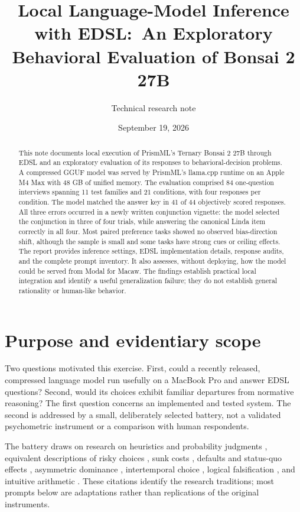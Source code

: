 \documentclass[11pt,letterpaper]{article}
\title{Local Language-Model Inference with EDSL:\
An Exploratory Behavioral Evaluation of Bonsai 2 27B}
\author{Technical research note}
\date{September 19, 2026}
\begin{document}
\maketitle
\begin{abstract}
This note documents local execution of PrismML's Ternary Bonsai 2 27B through
EDSL and an exploratory evaluation of its responses to behavioral-decision
problems. A compressed GGUF model was served by PrismML's llama.cpp runtime on
an Apple M4 Max with 48 GB of unified memory. The evaluation comprised 84
one-question interviews spanning 11 test families and 21 conditions, with four
responses per condition. The model matched the answer key in 41 of 44
objectively scored responses. All three errors occurred in a newly written
conjunction vignette: the model selected the conjunction in three of four
trials, while answering the canonical Linda item correctly in all four.
Most paired preference tasks showed no observed bias-direction shift, although
the sample is small and some tasks have strong cues or ceiling effects.
The report provides inference settings, EDSL implementation details, response
audits, and the complete prompt inventory. It also assesses, without deploying,
how the model could be served from Modal for Macaw. The findings establish
practical local integration and identify a useful generalization failure;
they do not establish general rationality or human-like behavior.
\end{abstract}

\section{Purpose and evidentiary scope}
Two questions motivated this exercise. First, could a recently released,
compressed language model run usefully on a MacBook Pro and answer EDSL
questions? Second, would its choices exhibit familiar departures from normative
reasoning? The first question concerns an implemented and tested system. The
second is addressed by a small, deliberately selected battery, not a validated
psychometric instrument or a comparison with human respondents.

The battery draws on research on heuristics and probability judgments
\citep{tversky1974,tversky1983}, equivalent descriptions of risky choices
\citep{tversky1981}, sunk costs \citep{arkes1985}, defaults and status-quo
effects \citep{samuelson1988}, asymmetric dominance \citep{huber1982},
intertemporal choice \citep{frederick2002}, logical falsification
\citep{wason1968}, and intuitive arithmetic \citep{frederick2005}.
These citations identify the research traditions; most prompts below are
adaptations rather than replications of the original instruments.
\end{document}
